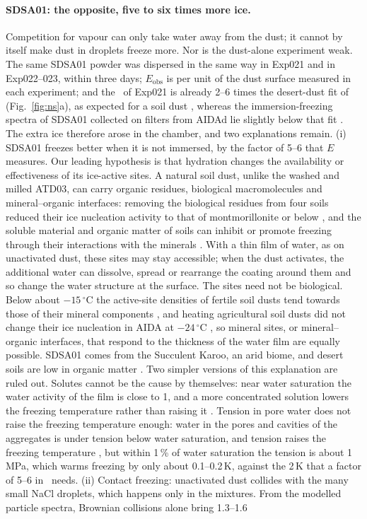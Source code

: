 \paragraph{SDSA01: the opposite, five to six times more ice.} Competition for vapour can only take water away from the dust; it cannot by itself make dust in droplets freeze more. Nor is the dust-alone experiment weak. The same SDSA01 powder was dispersed in the same way in Exp021 and in Exp022--023, within three days; $E_\mathrm{obs}$ is per unit of the dust surface measured in each experiment; and the \ns\ of Exp021 is already 2--6 times the desert-dust fit of \citet{Niemand2012} (Fig.~\ref{fig:ns}a), as expected for a soil dust \citep{Steinke2016}, whereas the immersion-freezing spectra of SDSA01 collected on filters from AIDAd lie slightly below that fit \citep{Bazo2026}. The extra ice therefore arose in the chamber, and two explanations remain. (i) SDSA01 freezes better when it is not immersed, by the factor of 5--6 that $E$ measures. Our leading hypothesis is that hydration changes the availability or effectiveness of its ice-active sites. A natural soil dust, unlike the washed and milled ATD03, can carry organic residues, biological macromolecules and mineral--organic interfaces: removing the biological residues from four soils reduced their ice nucleation activity to that of montmorillonite or below \citep{Conen2011}, and the soluble material and organic matter of soils can inhibit or promote freezing through their interactions with the minerals \citep{Hamzehpour2022}. With a thin film of water, as on unactivated dust, these sites may stay accessible; when the dust activates, the additional water can dissolve, spread or rearrange the coating around them and so change the water structure at the surface. The sites need not be biological. Below about $-15\,^\circ$C the active-site densities of fertile soil dusts tend towards those of their mineral components \citep{OSullivan2014}, and heating agricultural soil dusts did not change their ice nucleation in AIDA at $-24\,^\circ$C \citep{Steinke2016}, so mineral sites, or mineral--organic interfaces, that respond to the thickness of the water film are equally possible. SDSA01 comes from the Succulent Karoo, an arid biome, and desert soils are low in organic matter \citep{Conen2011} . Two simpler versions of this explanation are ruled out. Solutes cannot be the cause by themselves: near water saturation the water activity of the film is close to 1, and a more concentrated solution lowers the freezing temperature rather than raising it \citep{Koop2000}. Tension in pore water does not raise the freezing temperature enough: water in the pores and cavities of the aggregates \citep{Marcolli2014} is under tension below water saturation, and tension raises the freezing temperature \citep{Marcolli2017,Marcolli2020}, but within 1\,\% of water saturation the tension is about 1\,MPa, which warms freezing by only about 0.1--0.2\,K, against the 2\,K that a factor of 5--6 in \ns\ needs. (ii) Contact freezing: unactivated dust collides with the many small NaCl droplets, which happens only in the mixtures. From the modelled particle spectra, Brownian collisions alone bring 1.3--1.6\cmc\ 